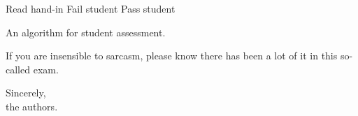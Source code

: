 \documentclass[a4paper,addpoints]{miunexam}
\begin{document}
\begin{questions}

	\begin{algorithm}[p]
		\begin{algorithmic}
			\Statex

				\State Read hand-in
					Fail student
				\Else
					Pass student
				\EndIf
			\EndWhile
		\end{algorithmic}
		\caption{An algorithm for student assessment.}
		\label{alg:FailStudents}
	\end{algorithm}

\end{questions}

\vspace{2cm}
If you are insensible to sarcasm, please know there has been a lot of it in
this so-called exam.
\vspace{0.5cm}
\begin{flushright}
	\parbox{0.5\textwidth}{
	Sincerely,\\
	the authors.
	}
\end{flushright}
\end{document}
